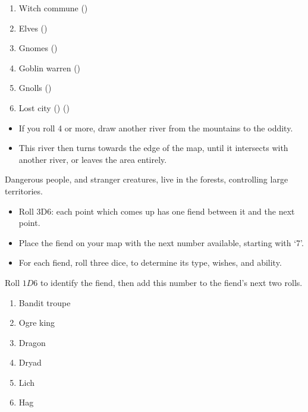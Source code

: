 \begin{multicols}{2}
\begin{multicols}{2}
\begin{enumerate}\raggedright
\item
  Witch commune (\Hu)
\item
  Elves (\El)
\item
  Gnomes (\Gn)
\item
  Goblin warren (\N)
\item
  Gnolls (\Nl)
\item
  Lost city (\D) ()
\end{enumerate}
\end{multicols}

\begin{itemize}
  \item
  If you roll 4 or more, draw another river from the mountains to the oddity.
  \item
  This river then turns towards the edge of the map, until it intersects with another river, or leaves the area entirely.
\end{itemize}


Dangerous people, and stranger creatures, live in the forests, controlling large territories.

\begin{itemize}
\item
  Roll 3D6: each point which comes up has one fiend between it and the
  next point.
\item
  Place the fiend on your map with the next number available, starting
  with `7'.
\item
  For each fiend, roll three dice, to determine its type, wishes, and
  ability.
\end{itemize}


Roll $1D6$ to identify the fiend, then add this number to the fiend's next two rolls.

\begin{multicols}{2}
\begin{enumerate}
\item
  Bandit troupe
\item
  Ogre king
\item
  Dragon
\item
  Dryad
\item
  Lich
\item
  Hag
\end{enumerate}
\end{multicols}


\end{multicols}
